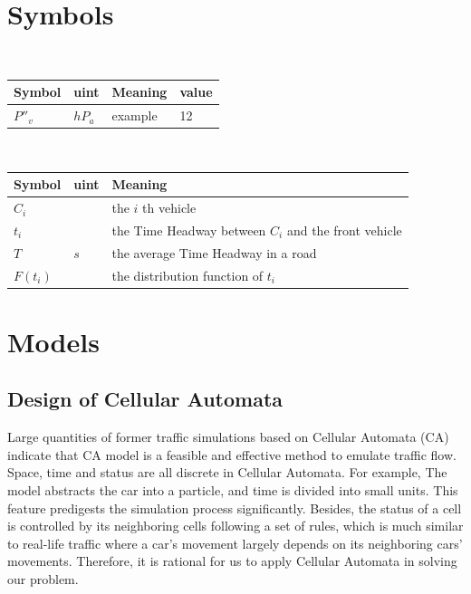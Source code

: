 \documentclass{mcmthesis}
\begin{document}
\section{Symbols}
\begin{table}[H]
        \setlength{\abovecaptionskip}{0pt}
        \setlength{\belowcaptionskip}{0pt}
				\\
        \begin{tabular}{p{2cm}|p{2cm}|p{7.5cm}|p{1.7cm}}
		\hline
		\rowcolor[gray]{0.9}\bf{Symbol}	&\bf{uint}      &\bf{Meaning}&\bf{value}	\\
		\hline
		${P}''_{v}$		& $hP_{a}$		 & example  &12\\

		\hline
	\end{tabular}
\end{table}

\begin{table}[H]
        \setlength{\abovecaptionskip}{0pt}
        \setlength{\belowcaptionskip}{0pt}
         \\
        \begin{tabular}{p{1.8cm}|p{2.2cm}|p{9cm}}
        \hline
        \rowcolor[gray]{0.9}\bf{Symbol}	&\bf{uint}      &\bf{Meaning}\\
        \hline
        $C_{i}$	&$ $ &the $i$ th vehicle\\
        $t_{i}$	&$ $ &the Time Headway between $ C_{i} $ and the front vehicle\\
        $T$	&$s$ &the average Time Headway in a road\\
        $F(t_{i})$	&$ $ &the distribution function of $t_{i}$
\\
        
        \end{tabular}
        \end{table}

\section{Models}
\subsection{Design of Cellular Automata }
Large quantities of former traffic simulations based on Cellular Automata (CA) indicate that CA model is a feasible and effective method to emulate traffic flow. Space, time and status are all discrete in Cellular Automata. For example, The model abstracts the car into a particle, and time is divided into small units. This feature predigests the simulation process significantly. Besides, the status of a cell is controlled by its neighboring cells following a set of rules, which is much similar to real-life traffic where a car's movement largely depends on its neighboring cars' movements. Therefore, it is rational for us to apply Cellular Automata in solving our problem.
\\
\end{document}
